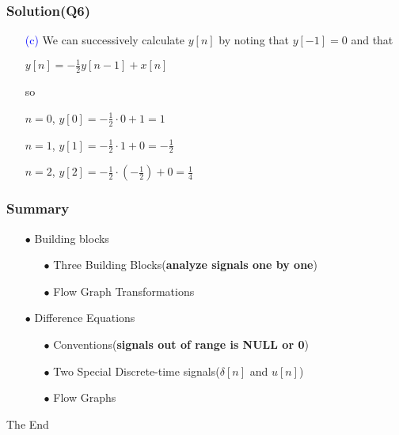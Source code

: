 \documentclass{beamer}
\newcommand{\blue}[1]{\textcolor{blue}{#1}}
\begin{document}
\begin{frame}
\frametitle{Solution(Q6)}

\begin{itemize} \itemsep1pt \parskip0pt 
  \item[\blue{(c)}]We can successively calculate $y[n]$ by noting that $y[-1]=0$ and that
  \item[] $y[n] = -\frac{1}{2}y[n-1] + x[n]$
  \item[] so
  \vspace{8 mm}
  \item[] $n = 0$, $y[0] = -\frac{1}{2} \cdot 0 + 1 = 1$
  \item[] $n = 1$, $y[1] = -\frac{1}{2} \cdot 1 + 0 = -\frac{1}{2}$
  \item[] $n = 2$, $y[2] = -\frac{1}{2} \cdot (-\frac{1}{2}) + 0 = \frac{1}{4}$
\end{itemize}


\end{frame}
\begin{frame}
\frametitle{Summary}

\begin{itemize} \itemsep1pt \parskip0pt 
    \item[$\bullet$] Building blocks
    \begin{itemize} \itemsep1pt \parskip0pt 
      \item[$\bullet$] Three Building Blocks({\bf analyze signals one by one})
      \item[$\bullet$] Flow Graph Transformations
    \end{itemize}
    \item[$\bullet$] Difference Equations
    \begin{itemize} \itemsep1pt \parskip0pt 
      \item[$\bullet$] Conventions({\bf signals out of range is NULL or 0})
      \item[$\bullet$] Two Special Discrete-time signals($\delta[n]$ and $u[n]$)
      \item[$\bullet$] Flow Graphs
    \end{itemize}
  \end{itemize}

\end{frame}


\begin{frame}
\Huge{\centerline{The End}}
\end{frame}







\end{document}
